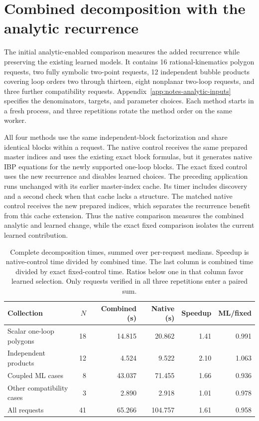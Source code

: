 \section{Combined decomposition with the analytic recurrence}
\label{sec:notes-analytic-results}
The initial analytic-enabled comparison measures the added recurrence while preserving the existing learned models. It contains 16 rational-kinematics polygon requests, two fully symbolic two-point requests, 12 independent bubble products covering loop orders two through thirteen, eight nonplanar two-loop requests, and three further compatibility requests. Appendix~\ref{app:notes-analytic-inputs} specifies the denominators, targets, and parameter choices. Each method starts in a fresh process, and three repetitions rotate the method order on the same worker.

All four methods use the same independent-block factorization and share identical blocks within a request. The native control receives the same prepared master indices and uses the existing exact block formulas, but it generates native IBP equations for the newly supported one-loop blocks. The exact fixed control uses the new recurrence and disables learned choices. The preceding application runs unchanged with its earlier master-index cache. Its timer includes discovery and a second check when that cache lacks a structure. The matched native control receives the new prepared indices, which separates the recurrence benefit from this cache extension. Thus the native comparison measures the combined analytic and learned change, while the exact fixed comparison isolates the current learned contribution.

\begin{table}[!htbp]\centering\small
\caption{Complete decomposition times, summed over per-request medians. Speedup is native-control time divided by combined time. The last column is combined time divided by exact fixed-control time. Ratios below one in that column favor learned selection. Only requests verified in all three repetitions enter a paired sum.}
\label{tab:notes-analytic-results}
\begin{tabular}{@{}lrrrrr@{}}\toprule
Collection & $N$ & Combined (s) & Native (s) & Speedup & ML/fixed\\\midrule
Scalar one-loop polygons & 18 & 14.815 & 20.862 & 1.41 & 0.991 \\
Independent products & 12 & 4.524 & 9.522 & 2.10 & 1.063 \\
Coupled ML cases & 8 & 43.037 & 71.455 & 1.66 & 0.936 \\
Other compatibility cases & 3 & 2.890 & 2.918 & 1.01 & 0.978 \\
All requests & 41 & 65.266 & 104.757 & 1.61 & 0.958 \\
\bottomrule\end{tabular}
\end{table}

